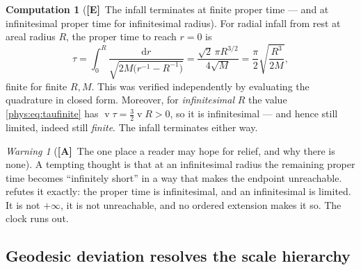 \documentclass[11pt,letterpaper]{article}
\numberwithin{equation}{section}
\theoremstyle{definition}
\newtheorem{computation}[theorem]{Computation}
\theoremstyle{remark}
\newtheorem{warning}[theorem]{Warning}
\DeclareMathOperator{\val}{v}
\newcommand{\dd}{\mathrm d}
\newcommand{\TE}{\textcolor{TierE}{\textsf{\bfseries[E]}}}
\newcommand{\TA}{\textcolor{TierA}{\textsf{\bfseries[A]}}}
\begin{document}
\begin{computation}[\TE\ The infall terminates at finite proper time ---
and at infinitesimal proper time for infinitesimal radius]
\label{phys:comp:finiteproper}
For radial infall from rest at areal radius $R$, the proper time to reach
$r=0$ is
\begin{equation}\label{phys:eq:taufinite}
\tau=\int_{0}^{R}\frac{\dd r}{\sqrt{2M\bigl(r^{-1}-R^{-1}\bigr)}}
=\frac{\sqrt2\,\pi R^{3/2}}{4\sqrt M}
=\frac{\pi}{2}\sqrt{\frac{R^{3}}{2M}},
\end{equation}
finite for finite $R,M$. This was verified independently by evaluating the
quadrature in closed form. Moreover, for \emph{infinitesimal} $R$ the value
\eqref{phys:eq:taufinite} has $\val\tau=\tfrac32\val R>0$, so it is
infinitesimal --- and hence still limited, indeed still \emph{finite}. The
infall terminates either way.
\end{computation}

\begin{warning}[\TA\ The one place a reader may hope for relief, and why there
is none]
\label{phys:warn:tau}
A tempting thought is that at an infinitesimal radius the remaining proper time
becomes ``infinitely short'' in a way that makes the endpoint unreachable.
 refutes it exactly: the proper time is
infinitesimal, and an infinitesimal is limited. It is not $+\infty$, it is not
unreachable, and no ordered extension makes it so. The clock runs out.
\end{warning}

\subsection{Geodesic deviation resolves the scale hierarchy}
\label{phys:sub:tides}
\end{document}
